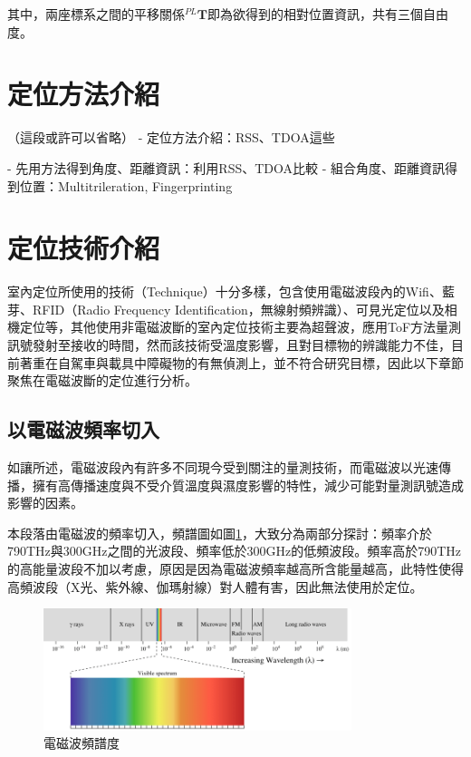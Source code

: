     
    
   其中，兩座標系之間的平移關係$^{PL}\boldsymbol{T}$即為欲得到的相對位置資訊，共有三個自由度。

 



\section{定位方法介紹}
（這段或許可以省略）
    - 定位方法介紹：RSS、TDOA這些
    
    
    - 先用方法得到角度、距離資訊：利用RSS、TDOA比較
    - 組合角度、距離資訊得到位置：Multitrileration, Fingerprinting

\section{定位技術介紹}

    室內定位所使用的技術（Technique）十分多樣，包含使用電磁波段內的Wifi、藍芽、RFID（Radio Frequency Identification，無線射頻辨識）、可見光定位以及相機定位等，其他使用非電磁波斷的室內定位技術主要為超聲波，應用ToF方法量測訊號發射至接收的時間，然而該技術受溫度影響，且對目標物的辨識能力不佳，目前著重在自駕車與載具中障礙物的有無偵測上\cite{survey_ultrasonic}，並不符合研究目標，因此以下章節聚焦在電磁波斷的定位進行分析。

    \subsection{以電磁波頻率切入}

        如讓所述，電磁波段內有許多不同現今受到關注的量測技術，而電磁波以光速傳播，擁有高傳播速度與不受介質溫度與濕度影響的特性，減少可能對量測訊號造成影響的因素。

        本段落由電磁波的頻率切入，頻譜圖如圖\ref{pic:spectrum}，大致分為兩部分探討：頻率介於790THz與300GHz之間的光波段、頻率低於300GHz的低頻波段\cite{book_electromagnetic}。頻率高於790THz的高能量波段不加以考慮，原因是因為電磁波頻率越高所含能量越高，此特性使得高頻波段（X光、紫外線、伽瑪射線）對人體有害，因此無法使用於定位。

        \begin{figure}[ht]
            \centering
            \includegraphics[width=9cm]{ch2pic/electro_spectrum.png}
            \caption{電磁波頻譜度\cite{Spectrum}}
            \label{pic:spectrum}
        \end{figure}

